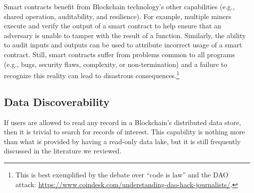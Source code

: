 Smart contracts benefit from Blockchain technology's other capabilities (e.g., shared operation, auditability, and resilience).
For example, multiple miners execute and verify the output of a smart contract to help ensure that an adversary is unable to tamper with the result of a function.
Similarly, the ability to audit inputs and outputs can be used to attribute incorrect usage of a smart contract.
Still, smart contracts suffer from problems common to all programs (e.g., bugs, security flaws, complexity, or non-termination) and a failure to recognize this reality can lead to disastrous consequences.\footnote{This is best exemplified by the debate over ``code is law'' and the DAO attack: \url{https://www.coindesk.com/understanding-dao-hack-journalists/}.}

\subsection{Data Discoverability}
If users are allowed to read any record in a Blockchain's distributed data store, then it is trivial to search for records of interest.
This capability is nothing more than what is provided by having a read-only data lake, but it is still frequently discussed in the literature we reviewed.